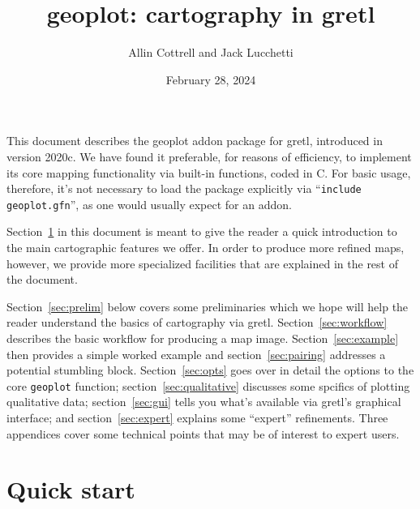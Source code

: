 \documentclass{article}
\begin{document}
\title{\textsf{geoplot}: cartography in gretl}
\author{Allin Cottrell and Jack Lucchetti}
\date{February 28, 2024}

\maketitle

This document describes the \textsf{geoplot} addon package for gretl,
introduced in version 2020c. We have found it preferable, for reasons
of efficiency, to implement its core mapping functionality via
built-in functions, coded in C. For basic usage, therefore, it's not
necessary to load the package explicitly via ``\texttt{include
  geoplot.gfn}'', as one would usually expect for an addon.

Section~\ref{sec:quick} in this document is meant to give the reader a
quick introduction to the main cartographic features we offer. In
order to produce more refined maps, however, we provide more
specialized facilities that are explained in the rest of the document.

Section~\ref{sec:prelim} below covers some preliminaries which we hope
will help the reader understand the basics of cartography via
gretl. Section~\ref{sec:workflow} describes the basic workflow for
producing a map image. Section~\ref{sec:example} then provides a
simple worked example and section~\ref{sec:pairing} addresses a
potential stumbling block. Section~\ref{sec:opts} goes over in detail
the options to the core \texttt{geoplot} function;
section~\ref{sec:qualitative} discusses some spcifics of plotting
qualitative data; section~\ref{sec:gui} tells you what's available via
gretl's graphical interface; and section~\ref{sec:expert} explains
some ``expert'' refinements. Three appendices cover some technical
points that may be of interest to expert users.

\section{Quick start}
\label{sec:quick}
\end{document}
